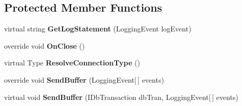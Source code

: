 \subsection*{Protected Member Functions}
\begin{DoxyCompactItemize}
\item 
\hypertarget{class_krs_1_1_base_1_1_logs_1_1_data_base_appender_aa7c0080eb6c1c473462082fc4062e1e8}{virtual string {\bfseries Get\-Log\-Statement} (Logging\-Event log\-Event)}\label{class_krs_1_1_base_1_1_logs_1_1_data_base_appender_aa7c0080eb6c1c473462082fc4062e1e8}

\item 
\hypertarget{class_krs_1_1_base_1_1_logs_1_1_data_base_appender_a2bfb14c67b2ab14a6e72caf33cd833e3}{override void {\bfseries On\-Close} ()}\label{class_krs_1_1_base_1_1_logs_1_1_data_base_appender_a2bfb14c67b2ab14a6e72caf33cd833e3}

\item 
\hypertarget{class_krs_1_1_base_1_1_logs_1_1_data_base_appender_ab4ddfb9e6d595f60b726110881c16b74}{virtual Type {\bfseries Resolve\-Connection\-Type} ()}\label{class_krs_1_1_base_1_1_logs_1_1_data_base_appender_ab4ddfb9e6d595f60b726110881c16b74}

\item 
\hypertarget{class_krs_1_1_base_1_1_logs_1_1_data_base_appender_a95ad583f03420bdd13cc7c8506332131}{override void {\bfseries Send\-Buffer} (Logging\-Event\mbox{[}$\,$\mbox{]} events)}\label{class_krs_1_1_base_1_1_logs_1_1_data_base_appender_a95ad583f03420bdd13cc7c8506332131}

\item 
\hypertarget{class_krs_1_1_base_1_1_logs_1_1_data_base_appender_ab50562553b5d20e455a9f4d7c9440180}{virtual void {\bfseries Send\-Buffer} (I\-Db\-Transaction db\-Tran, Logging\-Event\mbox{[}$\,$\mbox{]} events)}\label{class_krs_1_1_base_1_1_logs_1_1_data_base_appender_ab50562553b5d20e455a9f4d7c9440180}

\end{DoxyCompactItemize}
